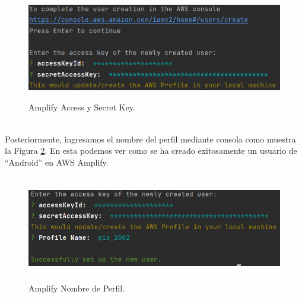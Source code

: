\documentclass[a4paper,10pt, oneside, titlepage]{article}
\begin{document}
	\begin{figure}[!h]
		\centering
		\includegraphics[width = 1\linewidth, height = 4.6cm]{Amplify_Access_Secret_Key.png}
		\caption{Amplify Access y Secret Key.}
		\label{Amplify_Access_Secret_Key}
	\end{figure} \\
	\indent Posteriormente, ingresamos el nombre del perfil mediante consola como muestra la Figura \ref{Amplify_Profile_Name}. En esta podemos ver como se ha creado exitosamente un usuario de ``Android'' en AWS Amplify.
	\begin{figure}[!h]
		\centering
		\includegraphics[width = 1\linewidth, height = 4.6cm]{Amplify_Profile_Name.png}
		\caption{Amplify Nombre de Perfil.}
		\label{Amplify_Profile_Name}
	\end{figure}
\end{document}
